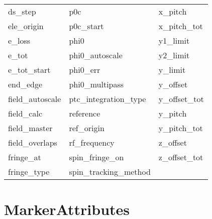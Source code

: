 \begin{tabular}{lll}
ds_step                     & p0c                         & x_pitch                     \\
ele_origin                  & p0c_start                   & x_pitch_tot                 \\
e_loss                      & phi0                        & y1_limit                    \\
e_tot                       & phi0_autoscale              & y2_limit                    \\
e_tot_start                 & phi0_err                    & y_limit                     \\
end_edge                    & phi0_multipass              & y_offset                    \\
field_autoscale             & ptc_integration_type        & y_offset_tot                \\
field_calc                  & reference                   & y_pitch                     \\
field_master                & ref_origin                  & y_pitch_tot                 \\
field_overlaps              & rf_frequency                & z_offset                    \\
fringe_at                   & spin_fringe_on              & z_offset_tot                \\
fringe_type                 & spin_tracking_method        &                             \\
 \bottomrule
 \end{tabular}
 \vfill
 
 \section{MarkerAttributes}
 \label{s:list.marker}
 
